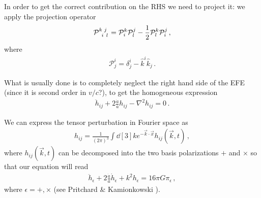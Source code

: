 \documentclass[main.tex]{subfiles}
\begin{document}
In order to get the correct contribution on the RHS we need to project it: we apply the projection operator 
%
\begin{align}
\tensor{\mathcal{P}}{^{k}_{i}^{j}_{l}} =
\mathcal{P}^{k}_{i} \mathcal{P}^{j}_{l}
- \frac{1}{2} \mathcal{P}^{k}_{l} \mathcal{P}^{j}_{i}
\,,
\end{align}
%
where 
%
\begin{align}
\mathcal{P}^{i}_{j} = \delta^{i}_{j} - \hat{k}^{i}\hat{k}_{j}
\,.
\end{align}


What is usually done is to completely neglect the right hand side of the EFE (since it is second order in \(v/c\)?), to get the homogeneous expression 
%
\begin{align}
\ddot{h}_{ij} + 2 \frac{\dot{a}}{a} h_{ij} - \nabla^2 h_{ij} = 0
\,.
\end{align}

We can express the tensor perturbation in Fourier space as 
%
\begin{align}
h_{ij} = \frac{1}{(2\pi )^3} \int \dd[3]{k} e^{- \vec{k} \cdot \vec{x}}
h_{ij} (\vec{k}, t)
\,,
\end{align}
%
where \(h_{ij} (\vec{k}, t)\) can be decomposed into the two basis polarizations \(+\) and \(\times \)
so that our equation will read 
%
\begin{align}
\ddot{h}_{\epsilon } + 2 \frac{\dot{a}}{a} \dot{h}_{\epsilon } + k^2 h_{\epsilon } = 16 \pi G \pi_{\epsilon }
\,,
\end{align}
%
where \(\epsilon = +, \times \) (see Pritchard \& Kamionkowski \cite[]{pritchardCosmicMicrowaveBackground2005}). 
\end{document}
